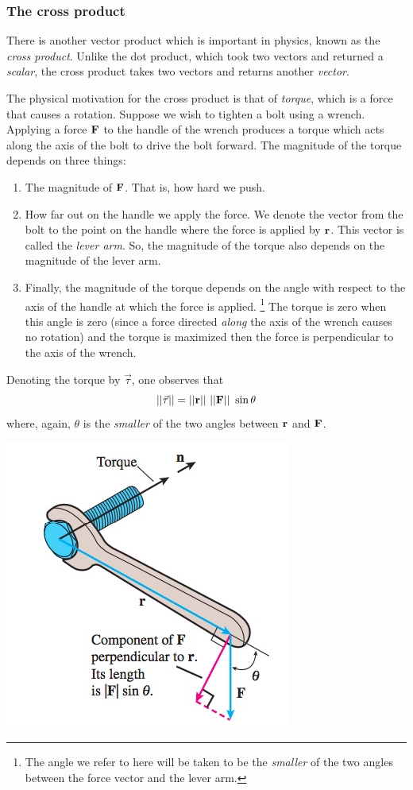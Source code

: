 \documentclass[12pt,letterpaper,reqno]{article}
\numberwithin{equation}{section}
\newcommand{\ti}[1]{\textit{#1}}
\begin{document}
\subsubsection{The cross product}
There is another vector product which is important in physics, known as the \ti{cross product}. Unlike the dot product, which took two vectors and returned a \ti{scalar}, the cross product takes two vectors and returns another \ti{vector}.

The physical motivation for the cross product is that of \ti{torque}, which is a force that causes a rotation. Suppose we wish to tighten a bolt using a wrench. Applying a force ${\bf F}$ to the handle of the wrench produces a torque which acts along the axis of the bolt to drive the bolt forward. The magnitude of the torque depends on three things:
\begin{enumerate}
	\item The magnitude of ${\bf F}$. That is, how hard we push.
	\item How far out on the handle we apply the force. We denote the vector from the bolt to the point on the handle where the force is applied by ${\bf r}$. This vector is called the \ti{lever arm}. So, the magnitude of the torque also depends on the magnitude of the lever arm.
	\item Finally, the magnitude of the torque depends on the angle with respect to the axis of the handle at which the force is applied. \footnote{The angle we refer to here will be taken to be the \ti{smaller} of the two angles between the force vector and the lever arm.} The torque is zero when this angle is zero (since a force directed \ti{along} the axis of the wrench causes no rotation) and the torque is maximized then the force is perpendicular to the axis of the wrench.
\end{enumerate}
Denoting the torque by $\vec{\tau}$, one observes that 
\begin{equation}\label{eq:magnitude_of_torque}
	||\vec{\tau}||=||{\bf r}||\ ||{\bf F}||\ \sin \theta
\end{equation}
where, again, $\theta$ is the \ti{smaller} of the two angles between ${\bf r}$ and ${\bf F}$.
\begin{center}
	\includegraphics[scale=0.5]{figures_mvc/torque_wrench}
\end{center}
\end{document}
